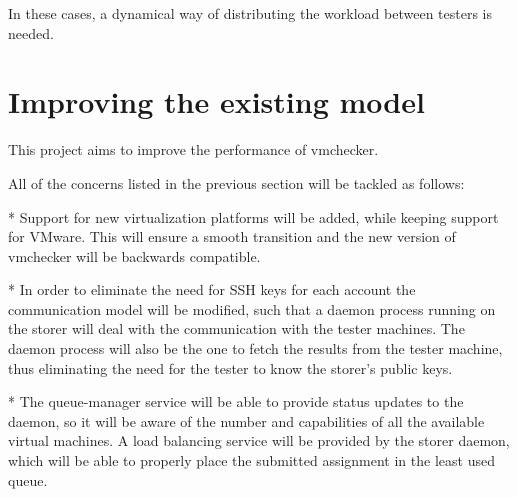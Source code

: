In these cases, a dynamical way of distributing the workload between testers is 
needed.

\section{Improving the existing model}
\label{sec:vmc-improving}

This project aims to improve the performance of vmchecker. 

All of the concerns listed in the previous section will be tackled as follows:

* Support for new virtualization platforms will be added, while keeping support
for VMware. This will ensure a smooth transition and the new version of vmchecker
will be backwards compatible.

* In order to eliminate the need for SSH keys for each account the communication
model will be modified, such that a daemon process running on the storer will
deal with the communication with the tester machines. The daemon process will also
be the one to fetch the results from the tester machine, thus eliminating the need
for the tester to know the storer's public keys.

* The queue-manager service will be able to provide status updates to the daemon,
so it will be aware of the number and capabilities of all the available virtual
machines. A load balancing service will be provided by the storer daemon, which
will be able to properly place the submitted assignment in the least used queue.
